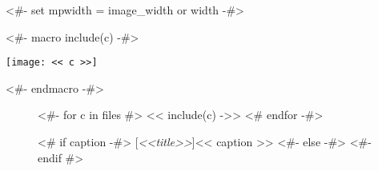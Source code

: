 <#- set mpwidth = image_width or width -#>

<#- macro include(c) -#>
  \begin{minipage}[t]{<< mpwidth >>}
  \texttt{[image: << c >>]}
  \end{minipage}\hspace{5pt}
<#- endmacro -#>

\begin{figure}
  <#- for c in files  #>
    << include(c) ->>
  <# endfor  -#>\hfill
  \hspace{5pt}
  \begin{minipage}[b]{<< width >>}
    <# if caption -#>
    [\textit{<<title>>}]{<< caption >>}
    <#- else -#>
    <#- endif #>\label{fig:<< id >>}
  \end{minipage}
\end{figure}

